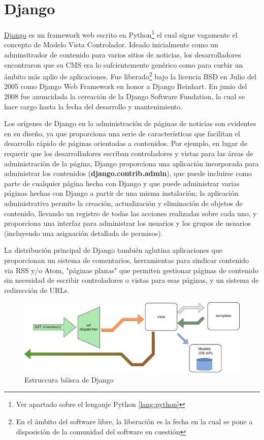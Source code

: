 \documentclass[a4paper]{report}
\begin{document}
\section{Django}
\href{http://www.djangoproject.com}{Django} es un framework web escrito en
Python\footnote{Ver apartado sobre el lengauje Python \ref{lang:python}}  el
cual 
sigue vagamente el concepto de Modelo Vista
Controlador. Ideado inicialmente como un adminsitrador de contenido para varios
sitios de noticias, 
los desarrolladores encontraron que su CMS era lo sufcientemente genérico como
para curbir un ámbito más aplio de aplicaciones. Fue liberado\footnote{En el
ámbito del software libre, la liberación es la fecha en la cual se pone a
disposición de la comunidad del software en cuestión} bajo la licencia BSD en
Julio del 2005 como Django Web Framework en honor a Django Reinhart. En junio
del
2008 fue anuncidada la cereación de la Django Software Fundation, la cual se
hace
cargo hasta la fecha del desarrollo y mantenimiento.

Los orígenes de Django en la administración de páginas de noticias son evidentes
en su diseño, ya que proporciona una serie de características que facilitan el
desarrollo rápido de páginas orientadas a contenidos. Por ejemplo, en lugar de
requerir que los desarrolladores escriban controladores y vistas para las áreas
de administración de la página, Django proporciona una aplicación incorporada
para administrar los contenidos (\textbf{django.contrib.admin}), 
que puede incluirse como parte de cualquier
página hecha con Django y que puede administrar varias páginas hechas con Django
a partir de una misma instalación; la aplicación administrativa permite la
creación, actualización y eliminación de objetos de contenido, llevando un
registro de todas las acciones realizadas sobre cada uno, y proporciona una
interfaz para administrar los usuarios y los grupos de usuarios (incluyendo una
asignación detallada de permisos).

La distribución principal de Django también aglutina aplicaciones que
proporcionan un sistema de comentarios, herramientas para sindicar contenido via
RSS y/o Atom, "páginas planas" que permiten gestionar páginas de contenido sin
necesidad de escribir controladores o vistas para esas páginas, y un sistema de
redirección de URLs.


\begin{figure}[htp]
\centering
\includegraphics[scale=0.60]{img/django_simple_mtv.pdf}
\caption{Estruccura báisca de Django}\label{fig:erptsqfit}
\end{figure}
  
\end{document}
